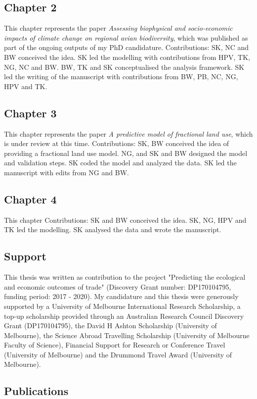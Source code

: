 \documentclass[titlesmallcaps,copyrightpage]{uomthesis}\usepackage[]{graphicx}\usepackage[]{color}
\begin{document}
\subsection*{Chapter 2}
This chapter represents the paper \textit{Assessing biophysical and socio-economic impacts of climate change on regional avian biodiversity}, which was published as part of the ongoing outputs of my PhD candidature.
Contributions: SK, NC and BW conceived the idea. SK led the modelling with contributions from HPV, TK, NG, NC and BW. BW, TK and SK conceptualised the analysis framework. SK led the writing of the manuscript with contributions from BW, PB, NC, NG, HPV and TK.

\subsection*{Chapter 3}
This chapter represents the paper \textit{A predictive model of fractional land use}, which is under review at this time. 
Contributions: SK, BW conceived the idea of providing a fractional land use model. NG, and SK and BW designed the model and validation steps. SK coded the model and analyzed the data. SK led the manuscript with edits from NG and BW.

\subsection*{Chapter 4}
This chapter 
Contributions: SK and BW conceived the idea. SK, NG, HPV and TK led the modelling. SK analysed the data and wrote the manuscript.

\subsection*{Support}
This thesis was written as contribution to the project "Predicting the ecological and economic outcomes of trade" (Discovery Grant number: DP170104795, funding period: 2017 - 2020). 
My candidature and this thesis were generously supported by a University of Melbourne International Research Scholarship, a top-up scholarship provided through an Australian Research Council Discovery Grant (DP170104795), the David H Ashton Scholarship (University of Melbourne), the Science Abroad Travelling Scholarship (University of Melbourne Faculty of Science), Financial Support for Research or Conference Travel (University of Melbourne) and the Drummond Travel Award (University of Melbourne).

\subsection*{Publications}
\end{document}
